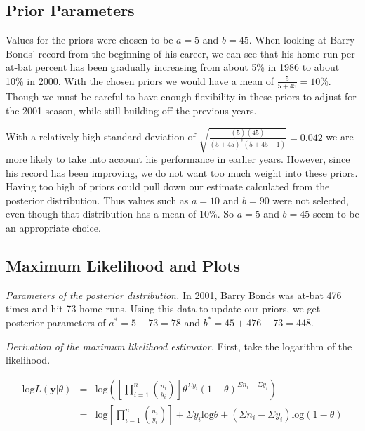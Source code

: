 \documentclass[12pt]{article}
\begin{document}
\subsection{Prior Parameters}

\noindent Values for the priors were chosen to be $a=5$ and $b=45$.  When looking at Barry Bonds' record from the beginning of his career, we can see that his home run per at-bat percent has been gradually increasing from about 5\% in 1986 to about 10\% in 2000.  With the chosen priors we would have a mean of $\frac{5}{5+45}=10\%$.  Though we must be careful to have enough flexibility in these priors to adjust for the 2001 season, while still building off the previous years.
\bigskip

\noindent With a relatively high standard deviation of $\sqrt{\frac{(5)(45)}{(5+45)^2(5+45+1)}}=0.042$ we are more likely to take into account his performance in earlier years.  However, since his record has been improving, we do not want too much weight into these priors.  Having too high of priors could pull down our estimate calculated from the posterior distribution.  Thus values such as $a=10$ and $b=90$ were not selected, even though that distribution has a mean of $10\%$.  So $a=5$ and $b=45$ seem to be an appropriate choice.
\bigskip


\subsection{Maximum Likelihood and Plots}



\noindent \emph{Parameters of the posterior distribution.}  In 2001, Barry Bonds was at-bat 476 times and hit 73 home runs.  Using this data to update our priors, we get posterior parameters of $a^*=5+73=78$ and $b^*=45+476-73=448$.
\bigskip

\noindent \emph{Derivation of the maximum likelihood estimator.}  First, take the logarithm of the likelihood.

\begin{eqnarray*}
\mathrm{log}L(\mathbf{y}|\theta)&=& \mathrm{log}\left(\left[\prod_{i=1}^n{n_i \choose y_i}\right]\theta^{\Sigma y_i}(1-\theta)^{\Sigma n_i-\Sigma y_i}\right) \\
&=& \mathrm{log}\left[\prod_{i=1}^n{n_i \choose y_i}\right]+\Sigma y_i\mathrm{log}\theta+(\Sigma n_i-\Sigma y_i)\mathrm{log}(1-\theta) \\
\end{eqnarray*}
\end{document}
